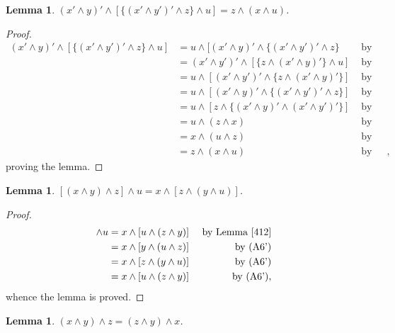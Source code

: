 \documentclass{amsart}
\theoremstyle{plain}
\newtheorem{lemma}[theorem]{Lemma}
\theoremstyle{problem}
\theoremstyle{definition}
\theoremstyle{remark}
\numberwithin{equation}{section}
\begin{document}
\begin{lemma}\label{414}
    $(x' \land y)' \land [\{(x' \land y')' \land z\} \land u] = z \land (x \land u)$.
\end{lemma}

\begin{proof}
\begin{align*}
    (x' \land y)' \land [\{(x' \land y')' \land z\} \land u]
          &= u \land [(x' \land y)' \land \{(x' \land y')'  \land z\} &\text{ by (A6')}\\
          &=(x' \land y')' \land [\{z \land (x' \land y)'\} \land u]  &\text{ by (A6')}\\
          &= u \land [(x' \land y')' \land \{z \land (x' \land y)'\}] &\text{ by (A6')}\\ 
          &= u \land [(x' \land y)' \land \{(x' \land y')' \land z\}] &\text{ by (A6')}\\            
          &= u \land [z \land \{(x' \land y)' \land (x' \land y')'\}]  &\text{ by (A6')}\\                    
          &= u \land (z \land x) &\text{ by (B2)}\\
          &= x \land (u \land z) &\text{ by (A6')}\\
          &= z \land (x \land u) &\text{ by (A6')},
\end{align*}
proving the lemma.
\end{proof}

\begin{lemma}\label{415}
    $[(x \land y) \land z] \land u = x \land [z \land (y \land u)]$.
\end{lemma}

\begin{proof}
\begin{align*}
     [(x \land y) \land z] \land u 
           &= x \land [u \land (z \land y)] &\text{ by Lemma \ref{412}} \\ 
           &= x \land [y \land (u \land z)] &\text{ by (A6')}\\
           &= x \land [z \land (y \land u)] &\text{ by (A6')}\\
           &= x \land [u \land (z \land y)] &\text{ by (A6')},
\end{align*}
whence the lemma is proved.
\end{proof}

\begin{lemma}\label{416}
    $(x \land y) \land z = (z \land y) \land x$.
\end{lemma}
\end{document}
